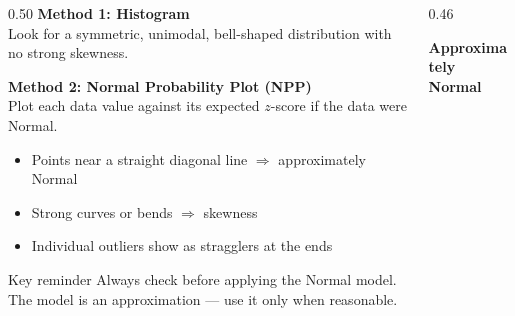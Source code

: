 \documentclass[aspectratio=169, 11pt]{beamer}
\begin{document}
{
\begin{frame}[t, plain]
  \vspace{0.45cm}\par
  \hspace{0.55cm}%
  \begin{minipage}{0.9\textwidth}


    \begin{columns}[T]
      \begin{column}{0.50\textwidth}
        \small
        \textbf{Method 1: Histogram}\\
        Look for a symmetric, unimodal, bell-shaped distribution
        with no strong skewness.

        \vspace{0.5em}
        \textbf{Method 2: Normal Probability Plot (NPP)}\\
        Plot each data value against its expected $z$-score if the
        data were Normal.
        \begin{itemize}
          \setlength{\itemsep}{0.3em}
          \item Points near a straight diagonal line
                $\Rightarrow$ approximately Normal
          \item Strong curves or bends $\Rightarrow$ skewness
          \item Individual outliers show as stragglers at the ends
        \end{itemize}

        \vspace{0.4em}
        \begin{block}{Key reminder}
          \small
          Always check before applying the Normal model.
          The model is an approximation --- use it only when reasonable.
        \end{block}
      \end{column}
      \begin{column}{0.46\textwidth}
        \begin{center}
        \textbf{Approximately Normal}\\[4pt]


\end{center}
\end{column}
\end{columns}
\end{minipage}
\end{frame}}
\end{document}

